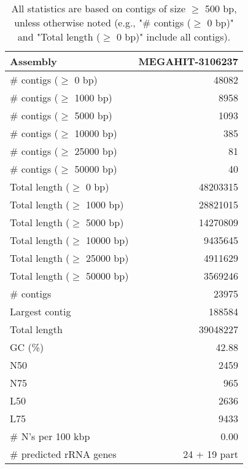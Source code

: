 \documentclass[12pt,a4paper]{article}
\begin{document}
\begin{table}[ht]
\begin{center}
\caption{All statistics are based on contigs of size $\geq$ 500 bp, unless otherwise noted (e.g., "\# contigs ($\geq$ 0 bp)" and "Total length ($\geq$ 0 bp)" include all contigs).}
\begin{tabular}{|l*{1}{|r}|}
\hline
Assembly & MEGAHIT-3106237 \\ \hline
\# contigs ($\geq$ 0 bp) & 48082 \\ \hline
\# contigs ($\geq$ 1000 bp) & 8958 \\ \hline
\# contigs ($\geq$ 5000 bp) & 1093 \\ \hline
\# contigs ($\geq$ 10000 bp) & 385 \\ \hline
\# contigs ($\geq$ 25000 bp) & 81 \\ \hline
\# contigs ($\geq$ 50000 bp) & 40 \\ \hline
Total length ($\geq$ 0 bp) & 48203315 \\ \hline
Total length ($\geq$ 1000 bp) & 28821015 \\ \hline
Total length ($\geq$ 5000 bp) & 14270809 \\ \hline
Total length ($\geq$ 10000 bp) & 9435645 \\ \hline
Total length ($\geq$ 25000 bp) & 4911629 \\ \hline
Total length ($\geq$ 50000 bp) & 3569246 \\ \hline
\# contigs & 23975 \\ \hline
Largest contig & 188584 \\ \hline
Total length & 39048227 \\ \hline
GC (\%) & 42.88 \\ \hline
N50 & 2459 \\ \hline
N75 & 965 \\ \hline
L50 & 2636 \\ \hline
L75 & 9433 \\ \hline
\# N's per 100 kbp & 0.00 \\ \hline
\# predicted rRNA genes & 24 + 19 part \\ \hline
\end{tabular}
\end{center}
\end{table}
\end{document}
